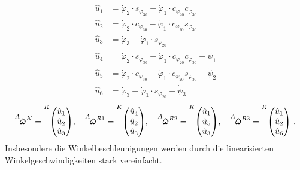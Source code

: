 \begin{align}
\hat{u}_1 &= \dot{\varphi}_2\cdot s_{\varphi_{30}} + \dot{\varphi}_1\cdot c_{\varphi_{20}}c_{\varphi_{30}} \\
\hat{u}_2 &= \dot{\varphi}_2\cdot c_{\varphi_{30}} - \dot{\varphi}_1\cdot c_{\varphi_{20}} s_{\varphi_{30}} \\
\hat{u}_3 &= \dot{\varphi}_3 + \dot{\varphi}_1\cdot s_{\varphi_{20}} \\
\hat{u}_4 &= \dot{\varphi}_2\cdot s_{\varphi_{30}} + \dot{\varphi}_1\cdot c_{\varphi_{20}} c_{\varphi_{30}} + \dot{\psi}_1 \\
\hat{u}_5 &= \dot{\varphi}_2\cdot c_{\varphi_{30}} - \dot{\varphi}_1\cdot c_{\varphi_{20}}s_{\varphi_{30}} + \dot{\psi}_2 \\
\hat{u}_6 &= \dot{\varphi}_3 + \dot{\varphi}_1\cdot s_{\varphi_{20}} + \dot{\psi}_3
\end{align}
\begin{equation}
\vel{A}{\hat{\omega}}{K} = \vecBS{K}{\hat{u}_1}{\hat{u}_2}{\hat{u}_3}, \hspace{10pt} \vel{A}{\hat{\omega}}{R1} = \vecBS{K}{\hat{u}_4}{\hat{u}_2}{\hat{u}_3}, \hspace{10pt}
\vel{A}{\hat{\omega}}{R2} = \vecBS{K}{\hat{u}_1}{\hat{u}_5}{\hat{u}_3}, \hspace{10pt}
\vel{A}{\hat{\omega}}{R3} = \vecBS{K}{\hat{u}_1}{\hat{u}_2}{\hat{u}_6} \,.
\end{equation}
Insbesondere die Winkelbeschleunigungen werden durch die linearisierten Winkelgeschwindigkeiten stark vereinfacht.
